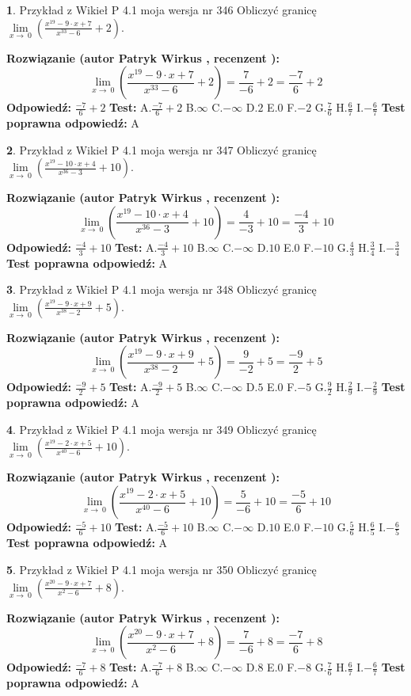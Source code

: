 \documentclass[12pt, a4paper]{article}
\theoremstyle{definition} %
\newtheorem{zad}{}
\newcommand{\zadStart}[1]{\begin{zad}#1\newline}
\newcommand{\zadStop}{\end{zad}}
\newcommand{\rozwStart}[2]{\noindent \textbf{Rozwiązanie (autor #1 , recenzent #2): }\newline}
\newcommand{\rozwStop}{\newline}
\newcommand{\odpStart}{\noindent \textbf{Odpowiedź:}\newline}
\newcommand{\odpStop}{\newline}
\newcommand{\testStart}{\noindent \textbf{Test:}\newline}
\newcommand{\testStop}{\newline}
\newcommand{\kluczStart}{\noindent \textbf{Test poprawna odpowiedź:}\newline}
\newcommand{\kluczStop}{\newline}
\begin{document}
\zadStart{Przykład z Wikieł P 4.1 moja wersja nr 346}
Obliczyć granicę $\lim\limits_{x\to\ 0}(\frac{x^{19}-9 \cdot x +7}{x^{33}-6}+2)$.
\zadStop
\rozwStart{Patryk Wirkus}{}
$$\lim\limits_{x\to\ 0}(\frac{x^{19}-9 \cdot x +7}{x^{33}-6}+2)=\frac{7}{-6}+2=\frac{-7}{6}+2$$
\rozwStop
\odpStart
$\frac{-7}{6}+2$
\odpStop
\testStart
A.$\frac{-7}{6}+2$
B.$\infty$
C.$-\infty$
D.$2$
E.$0$
F.$-2$
G.$\frac{7}{6}$
H.$\frac{6}{7}$
I.$-\frac{6}{7}$
\testStop
\kluczStart
A
\kluczStop



\zadStart{Przykład z Wikieł P 4.1 moja wersja nr 347}
Obliczyć granicę $\lim\limits_{x\to\ 0}(\frac{x^{19}-10 \cdot x +4}{x^{36}-3}+10)$.
\zadStop
\rozwStart{Patryk Wirkus}{}
$$\lim\limits_{x\to\ 0}(\frac{x^{19}-10 \cdot x +4}{x^{36}-3}+10)=\frac{4}{-3}+10=\frac{-4}{3}+10$$
\rozwStop
\odpStart
$\frac{-4}{3}+10$
\odpStop
\testStart
A.$\frac{-4}{3}+10$
B.$\infty$
C.$-\infty$
D.$10$
E.$0$
F.$-10$
G.$\frac{4}{3}$
H.$\frac{3}{4}$
I.$-\frac{3}{4}$
\testStop
\kluczStart
A
\kluczStop



\zadStart{Przykład z Wikieł P 4.1 moja wersja nr 348}
Obliczyć granicę $\lim\limits_{x\to\ 0}(\frac{x^{19}-9 \cdot x +9}{x^{38}-2}+5)$.
\zadStop
\rozwStart{Patryk Wirkus}{}
$$\lim\limits_{x\to\ 0}(\frac{x^{19}-9 \cdot x +9}{x^{38}-2}+5)=\frac{9}{-2}+5=\frac{-9}{2}+5$$
\rozwStop
\odpStart
$\frac{-9}{2}+5$
\odpStop
\testStart
A.$\frac{-9}{2}+5$
B.$\infty$
C.$-\infty$
D.$5$
E.$0$
F.$-5$
G.$\frac{9}{2}$
H.$\frac{2}{9}$
I.$-\frac{2}{9}$
\testStop
\kluczStart
A
\kluczStop



\zadStart{Przykład z Wikieł P 4.1 moja wersja nr 349}
Obliczyć granicę $\lim\limits_{x\to\ 0}(\frac{x^{19}-2 \cdot x +5}{x^{40}-6}+10)$.
\zadStop
\rozwStart{Patryk Wirkus}{}
$$\lim\limits_{x\to\ 0}(\frac{x^{19}-2 \cdot x +5}{x^{40}-6}+10)=\frac{5}{-6}+10=\frac{-5}{6}+10$$
\rozwStop
\odpStart
$\frac{-5}{6}+10$
\odpStop
\testStart
A.$\frac{-5}{6}+10$
B.$\infty$
C.$-\infty$
D.$10$
E.$0$
F.$-10$
G.$\frac{5}{6}$
H.$\frac{6}{5}$
I.$-\frac{6}{5}$
\testStop
\kluczStart
A
\kluczStop



\zadStart{Przykład z Wikieł P 4.1 moja wersja nr 350}
Obliczyć granicę $\lim\limits_{x\to\ 0}(\frac{x^{20}-9 \cdot x +7}{x^{2}-6}+8)$.
\zadStop
\rozwStart{Patryk Wirkus}{}
$$\lim\limits_{x\to\ 0}(\frac{x^{20}-9 \cdot x +7}{x^{2}-6}+8)=\frac{7}{-6}+8=\frac{-7}{6}+8$$
\rozwStop
\odpStart
$\frac{-7}{6}+8$
\odpStop
\testStart
A.$\frac{-7}{6}+8$
B.$\infty$
C.$-\infty$
D.$8$
E.$0$
F.$-8$
G.$\frac{7}{6}$
H.$\frac{6}{7}$
I.$-\frac{6}{7}$
\testStop
\kluczStart
A
\kluczStop
\end{document}
